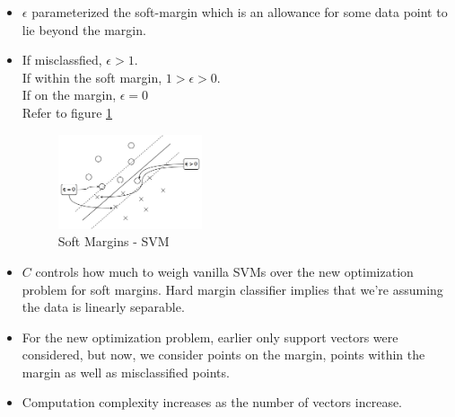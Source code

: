 \documentclass[parskip=half]{scrartcl}
\begin{document}
    \begin{itemize}
        \item $\epsilon$ parameterized the soft-margin which is an allowance for some data point to lie beyond the margin.
        \item If misclassfied, $\epsilon > 1$.\\ If within the soft margin, $1 > \epsilon > 0$.\\ If on the margin, $\epsilon = 0$\\
        Refer to figure \ref{fig:soft_margins}
        \begin{figure}[ht]
            \centering
            \includegraphics[width=0.4\textwidth]{soft_margins.png}
            \caption{Soft Margins - SVM}
            \label{fig:soft_margins}
        \end{figure}
        \item $C$ controls how much to weigh vanilla SVMs over the new optimization problem for soft margins. Hard margin classifier implies that we're assuming the data is linearly separable.
        \item For the new optimization problem, earlier only support vectors were considered, but now, we consider points on the margin, points within the margin as well as misclassified points.
        \item Computation complexity increases as the number of vectors increase.
    \end{itemize}
    
\end{document}
